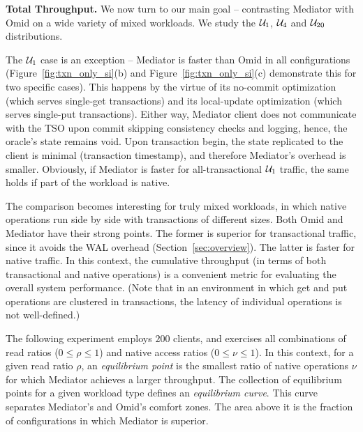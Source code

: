 
{\bf Total Throughput.} 
We now turn to our main goal -- contrasting Mediator with Omid on a wide variety of mixed workloads. 
We study the $\mathcal{U}_{1}$, $\mathcal{U}_{4}$ and $\mathcal{U}_{20}$  distributions.   

The $\mathcal{U}_{1}$ case is an exception -- Mediator is faster than Omid in all configurations
(Figure~\ref{fig:txn_only_si}(b) and Figure~\ref{fig:txn_only_si}(c) demonstrate this for two
specific cases). This happens by the virtue of its no-commit optimization (which
serves single-get transactions) and its local-update optimization (which serves
single-put transactions). Either way, Mediator client does not communicate with
the TSO upon commit skipping consistency checks and logging, hence, the oracle's
state remains void. Upon transaction begin, the state replicated to the client 
is minimal (transaction timestamp), and therefore Mediator's overhead is smaller. Obviously,
if Mediator is faster for all-transactional $\mathcal{U}_{1}$ traffic, the same holds if part of the workload
is native. 

The comparison becomes interesting for truly mixed workloads, in which native operations
run side by side with transactions of different sizes. Both Omid and Mediator have their strong points.
The former is superior for transactional traffic, since it avoids the WAL overhead (Section~\ref{sec:overview}). 
The latter is faster for native traffic. In this context, the cumulative throughput (in terms of both transactional 
and native operations) is a convenient metric for evaluating the overall system performance. (Note that in 
an environment in which get and put operations are clustered in transactions,
the latency of individual operations is not well-defined.) 

The following experiment employs $200$ clients, and exercises all combinations of read ratios 
($0 \leq \rho \leq 1$) and native access ratios ($0 \leq \nu \leq 1$). In this context, for a given 
read ratio $\rho$, an {\em equilibrium point\/} is the smallest ratio of native operations $\nu$ 
for which Mediator achieves a larger throughput. The collection of equilibrium points for a given 
workload type defines an {\em equilibrium curve}. This curve separates Mediator's and Omid's 
comfort zones. The area above it is the fraction of configurations in which Mediator 
is superior. 

